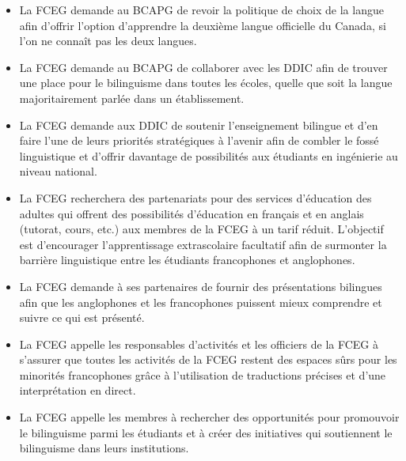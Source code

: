 \begin{itemize}
 \item La FCEG demande au BCAPG de revoir la politique de choix de la langue afin d'offrir l'option d'apprendre la deuxième langue officielle du Canada, si l'on ne connaît pas les deux langues.
 \item La FCEG demande au BCAPG de collaborer avec les DDIC afin de trouver une place pour le bilinguisme dans toutes les écoles, quelle que soit la langue majoritairement parlée dans un établissement.
 \item La FCEG demande aux DDIC de soutenir l'enseignement bilingue et d'en faire l'une de leurs priorités stratégiques à l'avenir afin de combler le fossé linguistique et d'offrir davantage de possibilités aux étudiants en ingénierie au niveau national.
 \item La FCEG recherchera des partenariats pour des services d'éducation des adultes qui offrent des possibilités d'éducation en français et en anglais (tutorat, cours, etc.) aux membres de la FCEG à un tarif réduit. L'objectif est d'encourager l'apprentissage extrascolaire facultatif afin de surmonter la barrière linguistique entre les étudiants francophones et anglophones.
 \item La FCEG demande à ses partenaires de fournir des présentations bilingues afin que les anglophones et les francophones puissent mieux comprendre et suivre ce qui est présenté.
 \item La FCEG appelle les responsables d'activités et les officiers de la FCEG à s'assurer que toutes les activités de la FCEG restent des espaces sûrs pour les minorités francophones grâce à l'utilisation de traductions précises et d'une interprétation en direct.
 \item La FCEG appelle les membres à rechercher des opportunités pour promouvoir le bilinguisme parmi les étudiants et à créer des initiatives qui soutiennent le bilinguisme dans leurs institutions.
\end{itemize}


